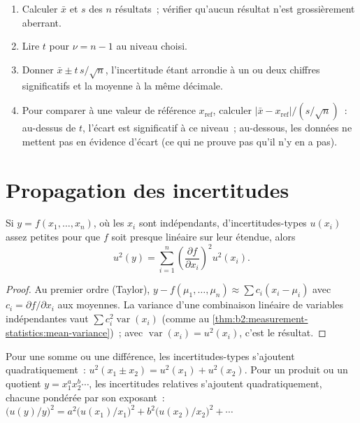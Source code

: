 \begin{method}\label{met:b2:measurement-statistics:confidence-interval}
\begin{enumerate}
  \item Calculer $\bar x$ et $s$ des $n$ résultats~; vérifier qu'aucun résultat n'est grossièrement aberrant.
  \item Lire $t$ pour $\nu = n - 1$ au niveau choisi.
  \item Donner $\bar x \pm t\,s/\sqrt n$, l'incertitude étant arrondie à un ou deux chiffres significatifs
        et la moyenne à la même décimale.
  \item Pour comparer à une valeur de référence $x_{\mathrm{ref}}$, calculer $|\bar x - x_{\mathrm{ref}}|/(s/\sqrt
        n)$~: au-dessus de $t$, l'écart est significatif à ce niveau~; au-dessous, les données ne mettent
        pas en évidence d'écart (ce qui ne prouve pas qu'il n'y en a pas).
\end{enumerate}
\end{method}

\section{Propagation des incertitudes}

\begin{theorem}\label{thm:b2:measurement-statistics:propagation}
Si $y = f(x_1, \dots, x_n)$, où les $x_i$ sont indépendants, d'incertitudes-types $u(x_i)$ assez
petites pour que $f$ soit presque linéaire sur leur étendue, alors
\begin{equation*}
u^2(y) = \sum_{i=1}^{n}\left(\frac{\partial f}{\partial x_i}\right)^2 u^2(x_i).
\end{equation*}
\end{theorem}

\begin{proof}
Au premier ordre (Taylor), $y - f(\mu_1, \dots, \mu_n) \approx \sum c_i(x_i - \mu_i)$ avec $c_i = \partial
f/\partial x_i$ aux moyennes. La variance d'une combinaison linéaire de variables indépendantes vaut
$\sum c_i^2\operatorname{var}(x_i)$ (comme au \cref{thm:b2:measurement-statistics:mean-variance})~; avec
$\operatorname{var}(x_i) = u^2(x_i)$, c'est le résultat.
\end{proof}

\begin{corollary}\label{cor:b2:measurement-statistics:products}
Pour une somme ou une différence, les incertitudes-types s'ajoutent quadratiquement~: $u^2(x_1 \pm x_2) = u^2(x_1) +
u^2(x_2)$. Pour un produit ou un quotient $y = x_1^{a}x_2^{b}\cdots$, les incertitudes relatives s'ajoutent
quadratiquement, chacune pondérée par son exposant~: $\bigl(u(y)/y\bigr)^2 = a^2\bigl(u(x_1)/x_1\bigr)^2 +
b^2\bigl(u(x_2)/x_2\bigr)^2 + \cdots$
\end{corollary}

